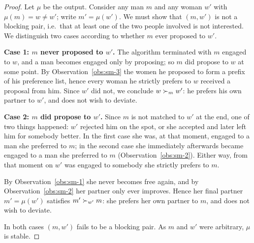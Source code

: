 \begin{proof}
Let $\mu$ be the output. Consider any man $m$ and any woman $w'$ with
$\mu(m) = w \neq w'$; write $m' = \mu(w')$. We must show that $(m,w')$ is not
a blocking pair, i.e.\ that at least one of the two people involved is not
interested. We distinguish two cases according to whether $m$ ever proposed to
$w'$.

\smallskip
\textbf{Case 1: $m$ never proposed to $w'$.}
The algorithm terminated with $m$ engaged to $w$, and a man becomes engaged
only by proposing; so $m$ did propose to $w$ at some point. By
Observation~\ref{obs:sm-3} the women he proposed to form a prefix of his
preference list, hence every woman he strictly prefers to $w$ received a
proposal from him. Since $w'$ did not, we conclude $w \succ_{m} w'$: he prefers
his own partner to $w'$, and does not wish to deviate.

\smallskip
\textbf{Case 2: $m$ did propose to $w'$.}
Since $m$ is not matched to $w'$ at the end, one of two things happened: $w'$
rejected him on the spot, or she accepted and later left him for somebody
better. In the first case she was, at that moment, engaged to a man she
preferred to $m$; in the second case she immediately afterwards became engaged
to a man she preferred to $m$ (Observation~\ref{obs:sm-2}). Either way, from that
moment on $w'$ was engaged to somebody she strictly prefers to $m$.

By Observation~\ref{obs:sm-1} she never becomes free again, and by
Observation~\ref{obs:sm-2} her partner only ever improves. Hence her final
partner $m' = \mu(w')$ satisfies $m' \succ_{w'} m$: she prefers her own partner
to $m$, and does not wish to deviate.

\smallskip
In both cases $(m,w')$ fails to be a blocking pair. As $m$ and $w'$ were
arbitrary, $\mu$ is stable.
\end{proof}

